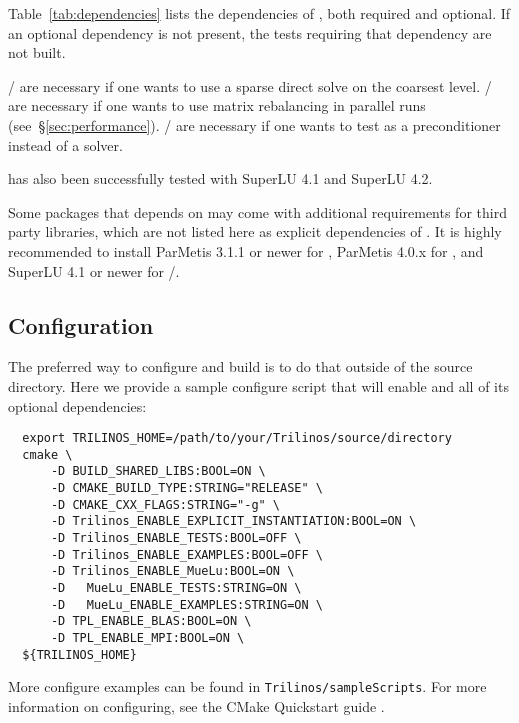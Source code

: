 Table~\ref{tab:dependencies} lists the dependencies of \muelu, both required and
optional. If an optional dependency is not present, the tests requiring that
dependency are not built.

\begin{mycomment}
\amesos{}/\amesostwo{} are necessary if one wants to use a sparse direct solve on the coarsest level.
\zoltan{}/\zoltantwo{} are necessary if one wants to use matrix rebalancing in parallel runs (see~\S\ref{sec:performance}).
\aztecoo{}/\belos{} are necessary if one wants to test \muelu{} as a preconditioner instead of a solver.
\end{mycomment}

\begin{mycomment}
\muelu{} has also been successfully tested with SuperLU 4.1 and SuperLU 4.2.
\end{mycomment}
\begin{mycomment}
Some packages that \muelu{} depends on may come with additional requirements for
third party libraries, which are not listed here as explicit dependencies of \muelu{}.
It is highly recommended to install ParMetis 3.1.1 or newer for \zoltan{},
ParMetis 4.0.x for \zoltantwo{}, and SuperLU 4.1 or newer for
\amesos{}/\amesostwo{}.
\end{mycomment}

\subsection{Configuration}
The preferred way to configure and build \muelu{} is to do that outside of the source directory.
Here we provide a sample configure script that will enable \muelu{} and all of its optional dependencies:
\begin{lstlisting}
  export TRILINOS_HOME=/path/to/your/Trilinos/source/directory
  cmake \
      -D BUILD_SHARED_LIBS:BOOL=ON \
      -D CMAKE_BUILD_TYPE:STRING="RELEASE" \
      -D CMAKE_CXX_FLAGS:STRING="-g" \
      -D Trilinos_ENABLE_EXPLICIT_INSTANTIATION:BOOL=ON \
      -D Trilinos_ENABLE_TESTS:BOOL=OFF \
      -D Trilinos_ENABLE_EXAMPLES:BOOL=OFF \
      -D Trilinos_ENABLE_MueLu:BOOL=ON \
      -D   MueLu_ENABLE_TESTS:STRING=ON \
      -D   MueLu_ENABLE_EXAMPLES:STRING=ON \
      -D TPL_ENABLE_BLAS:BOOL=ON \
      -D TPL_ENABLE_MPI:BOOL=ON \
  ${TRILINOS_HOME}
\end{lstlisting}

\noindent
More configure examples can be found in \texttt{Trilinos/sampleScripts}.
For more information on configuring, see the \trilinos CMake Quickstart guide \cite{TrilinosCmakeQuickStart}.

